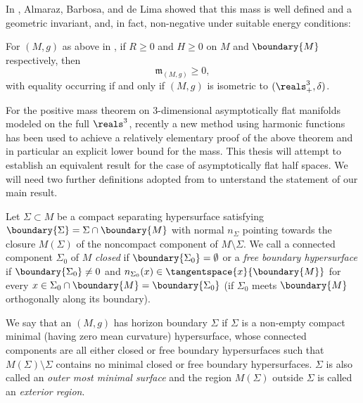 \documentclass[titlepage,numbers=noenddot,headinclude,oneside,%
footinclude=true,cleardoublepage=empty,%
BCOR=5mm,paper=a4,fontsize=11pt,%
english,%
]{scrartcl}
\newcommand{\mass}[2]{\mathfrak{m}_{(#1,#2)}} %
\begin{document}
In \cite{almarazPositiveMassTheorem2016}, Almaraz, Barbosa, and de Lima showed that this mass is well defined and a geometric invariant, and, in fact, non-negative under suitable energy conditions:
\begin{theorem}\label{thm:positive_mass_theorem_for_half_spaces}
    For \( (M,g) \) as above in , if \( R\geq 0 \) and \( H\geq 0 \) on \( M \) and \( \boundary{M} \) respectively, then
    \begin{equation*}
        \mass{M}{g}\geq 0,
    \end{equation*}  
    with equality occurring if and only if \( (M,g) \) is isometric to \( (\reals^3_+,\delta) \).
\end{theorem}
For the positive mass theorem on 3-dimensional asymptotically flat manifolds modeled on the full \( \reals^3 \), recently \parencite{brayHarmonicFunctionsMass2019} a new method using harmonic functions has been used to achieve a relatively elementary proof of the above theorem and in particular an explicit lower bound for the mass. This thesis will attempt to establish an equivalent result for the case of asymptotically flat half spaces. We will need two further definitions adopted from \cite{eichmairDoublingAsymptoticallyFlat2023} to unterstand the statement of our main result.
\begin{definition}
    Let \( \Sigma\subset M  \) be a compact separating hypersurface satisfying \( \boundary{\Sigma}=\Sigma\cap \boundary{M} \) with normal \( n_\Sigma \) pointing towards the closure \( M(\Sigma) \) of the noncompact component of \( M\setminus \Sigma \). We call a connected component \( \Sigma_0 \) of \( M \) \emph{closed} if \( \boundary{\Sigma_0}=\emptyset \) or a \emph{free boundary hypersurface} if \( \boundary{\Sigma_0}\neq 0 \) and \( n_{\Sigma_0}(x)\in \tangentspace{x}{\boundary{M}} \) for every \( x\in \Sigma_0\cap \boundary{M}=\boundary{\Sigma_0} \) (\ie if \( \Sigma_0 \) meets \( \boundary{M} \) orthogonally along its boundary).

    We say that an \( (M,g) \) has horizon boundary \( \Sigma \) if \( \Sigma \) is a non-empty compact minimal (\ie having zero mean curvature) hypersurface, whose connected components are all either closed or free boundary hypersurfaces such that \( M(\Sigma)\setminus \Sigma \) contains no minimal closed or free boundary hypersurfaces. \( \Sigma \) is also called an \emph{outer most minimal surface} and the region \( M(\Sigma) \) outside \( \Sigma \) is called an \emph{exterior region}.
\end{definition}
\end{document}
